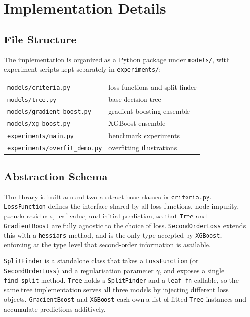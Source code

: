 \documentclass[a4paper, 11pt]{article}
\begin{document}
\pagebreak

\section{Implementation Details}

\subsection{File Structure}

The implementation is organized as a Python package under
\texttt{models/}, with experiment scripts kept separately in
\texttt{experiments/}:

\begin{center}
  \begin{tabular}{ll}
    \texttt{models/criteria.py}       & loss functions and split finder \\
    \texttt{models/tree.py}           & base decision tree \\
    \texttt{models/gradient\_boost.py} & gradient boosting ensemble \\
    \texttt{models/xg\_boost.py}      & XGBoost ensemble \\
    \texttt{experiments/main.py}      & benchmark experiments \\
    \texttt{experiments/overfit\_demo.py} & overfitting illustrations \\
  \end{tabular}
\end{center}

\subsection{Abstraction Schema}

The library is built around two abstract base classes in
\texttt{criteria.py}. \texttt{LossFunction} defines the interface
shared by all loss functions, node impurity, pseudo-residuals, leaf
value, and initial prediction, so that \texttt{Tree} and
\texttt{GradientBoost} are fully agnostic to the choice of loss.
\texttt{SecondOrderLoss} extends this with a \texttt{hessians}
method, and is the only type accepted by \texttt{XGBoost}, enforcing
at the type level that second-order information is available.

\texttt{SplitFinder} is a standalone class that takes a
\texttt{LossFunction} (or \texttt{SecondOrderLoss}) and a
regularisation parameter $\gamma$, and exposes a single
\texttt{find\_split} method. \texttt{Tree} holds a \texttt{SplitFinder}
and a \texttt{leaf\_fn} callable, so the same tree implementation
serves all three models by injecting different loss objects.
\texttt{GradientBoost} and \texttt{XGBoost} each own a list of
fitted \texttt{Tree} instances and accumulate predictions additively.
\end{document}

